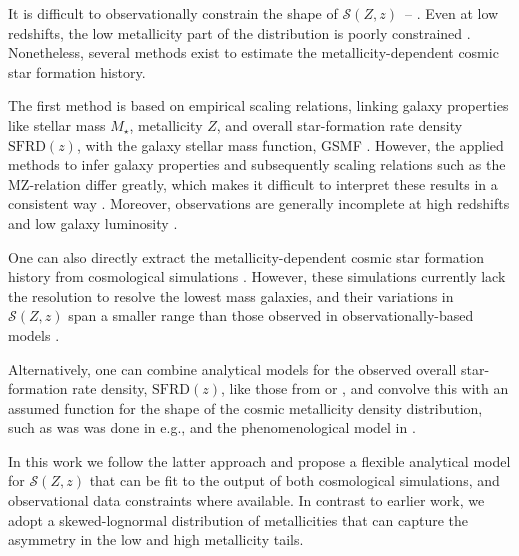 \documentclass[linenumbers,twocolumn]{aastex631}
\newcommand{\SFRDzZ}{\ensuremath{\mathcal{S}(Z,z)}\xspace}
\newcommand{\SFRDz}{\ensuremath{\mathrm{SFRD}(z)}\xspace}
\begin{document}
It is difficult to observationally constrain the shape of \SFRDzZ\ -- \citep[see e.g., ][for discussion of relevant observational caveats]{Chruslinska2019_obs,Boco+2021}. Even at low redshifts, the low metallicity part of the distribution is poorly constrained \citep{Chruslinska+2021}.
Nonetheless, several methods exist to estimate the metallicity-dependent cosmic star formation history. 

The first method is based on empirical scaling relations, linking galaxy properties like stellar mass $M_{\star}$, metallicity $Z$, and overall star-formation rate density \SFRDz, with the galaxy stellar mass function, GSMF \citep[see e.g.][]{Dominik+2013}. However, the applied methods to infer galaxy properties and subsequently scaling relations such as the MZ-relation differ greatly, which makes it difficult to interpret these results in a consistent way \citep[e.g.,][]{KewleyEllison2008,MaiolinoMannucci2019,Cresci+2019}. Moreover, observations are generally incomplete at high redshifts and low galaxy luminosity \citep[e.g.,][]{Chruslinska+2021}.

One can also directly extract the metallicity-dependent cosmic star formation history from cosmological simulations \citep[e.g.][]{Mapelli2017, Briel+2022_rates}. However, these simulations currently lack the resolution to resolve the lowest mass galaxies, and their variations in \SFRDzZ span a smaller range than those observed in observationally-based models \citep{Pakmor+2022}.

Alternatively, one can combine analytical models for the observed overall star-formation rate density, \SFRDz, like those from \cite{MadauDickinson2014} or \cite{Madau+2017}, and convolve this with an assumed function for the shape of the cosmic metallicity density distribution, such as was was done in e.g., \cite{LangerNorman2006} and the phenomenological model in \cite{Neijssel+2019}.

In this work we follow the latter approach and propose a flexible analytical model for \SFRDzZ that can be fit to the output of both cosmological simulations, and observational data constraints where available. 
In contrast to earlier work, we adopt a skewed-lognormal distribution of metallicities that can capture the asymmetry in the low and high metallicity tails. 
\end{document}
